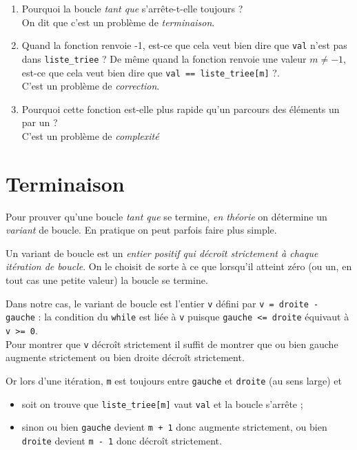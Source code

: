 \begin{enumerate}
	\item 	Pourquoi la boucle \textit{tant que} s'arrête-t-elle toujours ?\\ On dit que c'est un problème de \textit{terminaison}.
	\item 	Quand la fonction renvoie -1, est-ce que cela veut bien dire que \texttt{val} n'est pas dans \texttt{liste_triee} ? De même quand la fonction renvoie une valeur $m\neq -1$, est-ce que cela veut bien dire que \texttt{val == liste_triee[m]} ?.\\
	      C'est un problème de \textit{correction}.
	\item	Pourquoi cette fonction est-elle plus rapide qu'un parcours des éléments un par un ?\\ C'est un problème de \textit{complexité}
\end{enumerate}


\section{Terminaison}

Pour prouver qu'une boucle \textit{tant que} se termine, \textit{en théorie} on détermine un \textit{variant} de boucle. En pratique on peut parfois faire plus simple.

\begin{definition}[]
	Un variant de boucle est un \textit{entier positif qui décroît strictement à chaque itération de boucle}. On le choisit de sorte à ce que lorsqu'il atteint zéro (ou un, en tout cas une petite valeur) la boucle se termine.\\
\end{definition}

Dans notre cas, le variant de boucle est l'entier \texttt{v} défini par \texttt{v = droite - gauche} : la condition du \texttt{while} est liée à \texttt{v} puisque \texttt{gauche <= droite} équivaut à \texttt{v >= 0}.\\

Pour montrer que \texttt{v} décroît strictement il suffit de montrer que ou bien gauche augmente strictement ou bien droite décroît	strictement.

Or lors d'une itération, \texttt{m} est toujours entre \texttt{gauche} et \texttt{droite} (au sens large) et
\begin{itemize}
	\item soit on trouve que \texttt{liste_triee[m]} vaut \texttt{val} et la boucle s'arrête ;
	\item sinon ou bien \texttt{gauche} devient \texttt{m + 1} donc augmente strictement, ou bien \texttt{droite} devient \texttt{m - 1} donc décroît strictement.
\end{itemize}

